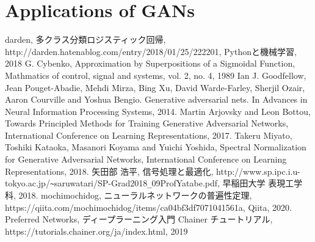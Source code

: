 \documentclass[11pt, a4paper, dvipdfmx]{jsarticle}
\theoremstyle{definition}
\begin{document}
\section{Applications of GANs}

\begin{thebibliography}{20}
     darden, 多クラス分類ロジスティック回帰, \\
    http://darden.hatenablog.com/entry/2018/01/25/222201, Pythonと機械学習, 2018
     G. Cybenko, Approximation by Superpositions of a Sigmoidal Function, Mathmatics of control, signal and systems, vol. 2, no. 4, 1989
     Ian J. Goodfellow, Jean Pouget-Abadie, Mehdi Mirza, Bing Xu, David Warde-Farley, Sherjil Ozair, Aaron Courville and Yoshua Bengio. 
    Generative adversarial nets. In Advances in Neural Information Processing Systems, 2014.
    Martin Arjovsky and Leon Bottou, Towards Principled Methods for Training Generative Adversarial Networks,
    International Conference on Learning Representations, 2017.
    Takeru Miyato, Toshiki Kataoka, Masanori Koyama and Yuichi Yoshida, Spectral Normalization for Generative Adversarial Networks, 
    International Conference on Learning Representations, 2018.
     矢田部 浩平, 信号処理と最適化, http://www.sp.ipc.i.u-tokyo.ac.jp/\verb|~|saruwatari/SP-Grad2018\verb|_|09ProfYatabe.pdf, 早稲田大学 表現工学科, 2018.
     mochimochidog, ニューラルネットワークの普遍性定理, \\
    https://qiita.com/mochimochidog/items/ca04bf3df7071041561a, Qiita, 2020.
    \bibitem{} Preferred Networks, ディープラーニング入門 Chainer チュートリアル,\\
     https://tutorials.chainer.org/ja/index.html, 2019
\end{thebibliography}
\end{document}
